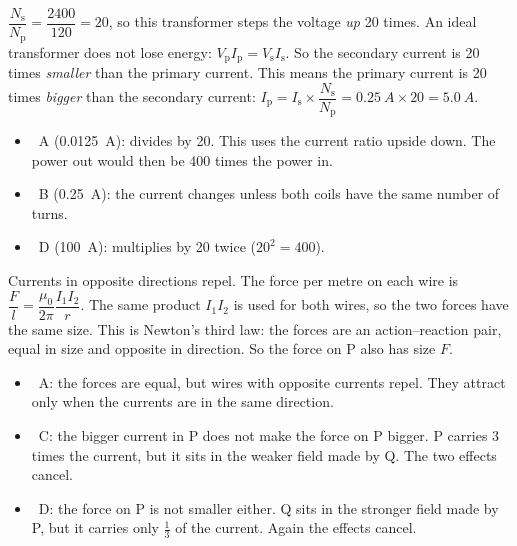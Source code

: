 \begin{practiceanswers}
\begin{practiceans}
  $\dfrac{N_\mathrm{s}}{N_\mathrm{p}} = \dfrac{2400}{120} = 20$, so this transformer steps
  the voltage \emph{up} 20 times. An ideal transformer does not lose energy:
  $V_\mathrm{p}I_\mathrm{p} = V_\mathrm{s}I_\mathrm{s}$. So the secondary current is 20
  times \emph{smaller} than the primary current. This means the primary current is 20 times
  \emph{bigger} than the secondary current:
  $I_\mathrm{p} = I_\mathrm{s} \times \dfrac{N_\mathrm{s}}{N_\mathrm{p}}
  = \qty{0.25}{A} \times 20 = \qty{5.0}{A}$.
  \begin{itemize}
    \item \xmark\ A (\qty{0.0125}{A}): divides by 20. This uses the current ratio upside
          down. The power out would then be 400 times the power in.
    \item \xmark\ B (\qty{0.25}{A}): the current changes unless both coils have the same
          number of turns.
    \item \xmark\ D (\qty{100}{A}): multiplies by 20 twice ($20^2 = 400$).
  \end{itemize}
\end{practiceans}

\begin{practiceans}
  Currents in opposite directions repel. The force per metre on each wire is
  $\dfrac{F}{l} = \dfrac{\mu_0}{2\pi}\dfrac{I_1 I_2}{r}$. The same product $I_1 I_2$ is used
  for both wires, so the two forces have the same size. This is Newton's third law: the
  forces are an action--reaction pair, equal in size and opposite in direction. So the force
  on P also has size $F$.
  \begin{itemize}
    \item \xmark\ A: the forces are equal, but wires with opposite currents repel. They
          attract only when the currents are in the same direction.
    \item \xmark\ C: the bigger current in P does not make the force on P bigger. P carries
          3 times the current, but it sits in the weaker field made by Q. The two effects
          cancel.
    \item \xmark\ D: the force on P is not smaller either. Q sits in the stronger field
          made by P, but it carries only $\frac{1}{3}$ of the current. Again the effects
          cancel.
  \end{itemize}
\end{practiceans}


\end{practiceanswers}
